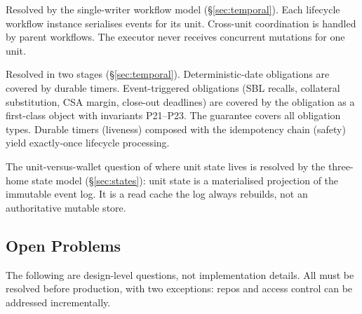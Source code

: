 \begin{description}[nosep]
\item[Concurrency.] Resolved by the single-writer workflow model (\S\ref{sec:temporal}). Each lifecycle workflow instance serialises events for its unit. Cross-unit coordination is handled by parent workflows. The executor never receives concurrent mutations for one unit.
\item[Liveness.] Resolved in two stages (\S\ref{sec:temporal}). Deterministic-date obligations are covered by durable timers. Event-triggered obligations (SBL recalls, collateral substitution, CSA margin, close-out deadlines) are covered by the obligation as a first-class object with invariants P21--P23. The guarantee covers all obligation types. Durable timers (liveness) composed with the idempotency chain (safety) yield exactly-once lifecycle processing.
\item[State attachment.] The unit-versus-wallet question of where unit state lives is resolved by the three-home state model (\S\ref{sec:states}): unit state is a materialised projection of the immutable event log. It is a read cache the log always rebuilds, not an authoritative mutable store.
\end{description}

\subsection{Open Problems}

The following are design-level questions, not implementation details. All must be resolved before production, with two exceptions: repos and access control can be addressed incrementally.

